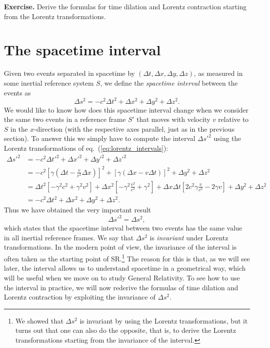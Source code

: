 \documentclass[11pt, a4paper,oneside,openright]{book}
\numberwithin{equation}{section}
\begin{document}
\par\vspace{\baselineskip}

{\bf Exercise.} Derive the formulas for time dilation and Lorentz contraction starting from the Lorentz transformations.

\section{The spacetime interval}

Given two events separated in spacetime by $(\Delta t,\Delta x,\Delta y,\Delta z)$, as measured in some inertial reference system $S$, we define the {\it spacetime interval} between the events as
\begin{equation}
\Delta s^2=-c^2\Delta t^2+\Delta x^2+\Delta y^2+\Delta z^2.
\end{equation}
We would like to know how does this spacetime interval change when we consider the same two events in a reference frame $S'$ that moves with velocity $v$ relative to $S$ in the $x$-direction (with the respective axes parallel, just as in the previous section). To answer this we simply have to compute the interval $\Delta s'^2$ using the Lorentz transformations of eq.\ (\ref{eq:lorentz_intervals}):
\begin{equation}
\begin{split}
\Delta s'^2&=-c^2\Delta t'^2+\Delta x'^2+\Delta y'^2+\Delta z'^2\\
&=-c^2\left[\gamma\left(\Delta t-\frac{v}{c^2}\Delta x\right)\right]^2+\left[\gamma\left(\Delta x-v\Delta t\right)\right]^2+\Delta y^2+\Delta z^2\\
&=\Delta t^2\left[-\gamma^2c^2+\gamma^2v^2\right]+\Delta x^2\left[-\gamma^2\frac{v^2}{c^2}+\gamma^2\right]+\Delta x\Delta t\left[2c^2\gamma\frac{v}{c^2}-2\gamma v\right]+\Delta y^2+\Delta z^2\\
&=-c^2\Delta t^2+\Delta x^2+\Delta y^2+\Delta z^2.
\end{split}
\end{equation}
Thus we have obtained the very important result
\begin{equation}
\Delta s'^2=\Delta s^2,
\end{equation}
which states that the spacetime interval between two events has the same value in all inertial reference frames. We say that $\Delta s^2$ is {\it invariant} under Lorentz transformations. In the modern point of view, the invariance of the interval is often taken as the starting point of SR.\footnote{We showed that $\Delta s^2$ is invariant by using the Lorentz transformations, but it turns out that one can also do the opposite, that is, to derive the Lorentz transformations starting from the invariance of the interval.} The reason for this is that, as we will see later, the interval allows us to understand spacetime in a geometrical way, which will be useful when we move on to study General Relativity. To see how to use the interval in practice, we will now rederive the formulas of time dilation and Lorentz contraction by exploiting the invariance of $\Delta s^2$.
\end{document}
